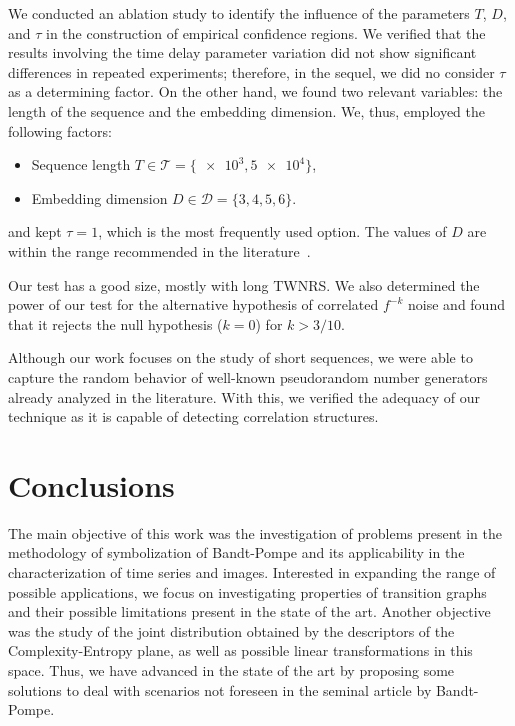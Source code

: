 \documentclass[a4,11pt]{pssbmac}
\begin{document}
We conducted an ablation study to identify the influence of the parameters $T$, $D$, and $\tau$ in the construction of empirical confidence regions.
We verified that the results involving the time delay parameter variation did not show significant differences in repeated experiments; therefore, in the sequel, we did no consider $\tau$ as a determining factor.
On the other hand, we found two relevant variables: the length of the sequence and the embedding dimension.
We, thus, employed the following factors:
\begin{itemize}
	\item Sequence length $T\in\mathcal T=\{ \num[scientific-notation=true]{e3}, \num[scientific-notation=true]{5 e4}\}$,
	\item Embedding dimension $D\in\mathcal D=\{3, 4, 5, 6\}$.
\end{itemize}
and kept $\tau=1$, which is the most frequently used option.
The values of $D$ are within the range recommended in the literature~\cite{PermutationEntropyBandtPompe}.

Our test has a good size, mostly with long TWNRS.
We also determined the power of our test for the alternative hypothesis of correlated $f^{-k}$ noise and found that it rejects the null hypothesis ($k=0$) for $k>3/10$.

Although our work focuses on the study of short sequences, we were able to capture the random behavior of well-known pseudorandom number generators already analyzed in the literature. 
With this, we verified the adequacy of our technique as it is capable of detecting correlation structures.

\section{Conclusions} 

The main objective of this work was the investigation of problems present in the methodology of symbolization of Bandt-Pompe and its applicability in the characterization of time series and images.
Interested in expanding the range of possible applications, we focus on investigating properties of transition graphs and their possible limitations present in the state of the art.
Another objective was the study of the joint distribution obtained by the descriptors of the Complexity-Entropy plane, as well as possible linear transformations in this space.
Thus, we have advanced in the state of the art by proposing some solutions to deal with scenarios not foreseen in the seminal article by Bandt-Pompe. 
\end{document}
